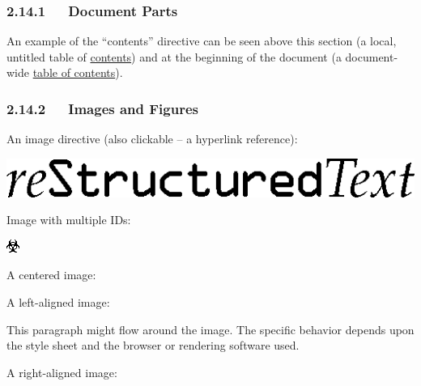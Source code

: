 \documentclass[a4paper]{article}
\begin{document}
\subsubsection{2.14.1   Document Parts%
  \label{document-parts}%
}

An example of the “contents” directive can be seen above this section
(a local, untitled table of \hyperref[contents]{contents}) and at the beginning of the
document (a document-wide \hyperref[table-of-contents]{table of contents}).


\subsubsection{2.14.2   Images and Figures%
  \label{images-and-figures}%
}

An image directive (also clickable – a hyperlink reference):

\hyperref[directives]{\includegraphics[width=0.7\linewidth]{../../../docs/user/rst/images/title.png}}

Image with multiple IDs:

\includegraphics{../../../docs/user/rst/images/biohazard.png}
\label{image-target-3}\label{image-target-2}\label{image-target-1}

A centered image:

\noindent{}

A left-aligned image:


This paragraph might flow around the image.
The specific behavior depends upon the style sheet and
the browser or rendering software used.

A right-aligned image:

\end{document}
